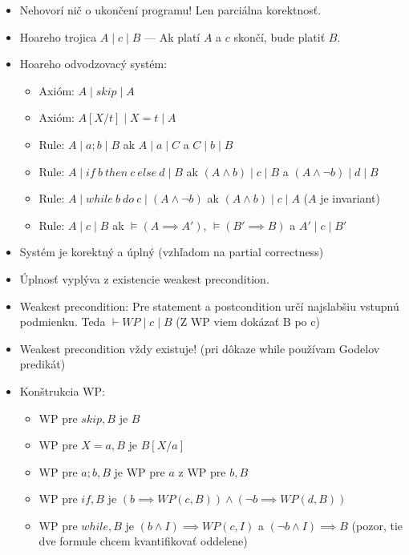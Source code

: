 \documentclass[paper=a4, fontsize=11pt]{scrartcl} %
\numberwithin{equation}{section} %
\numberwithin{figure}{section} %
\numberwithin{table}{section} %
\begin{document}
\begin{itemize}
	\item Nehovorí nič o ukončení programu! Len parciálna korektnosť.
	
	\item Hoareho trojica $A \mid c \mid B$ — Ak platí $A$ a $c$ skončí, bude platiť $B$.
	
	\item Hoareho odvodzovacý systém:
	
	\begin{itemize}
		\item Axióm: $A \mid skip \mid A$
		\item Axióm: $A[X/t] \mid X = t \mid A$
		\item Rule: $A \mid a;b \mid B$ ak $A \mid a \mid C$ a $C \mid b \mid B$
		\item Rule: $A \mid if\ b\ then\ c\ else\ d \mid B$ ak $(A \land b) \mid c \mid B$ a $(A \land \neg b) \mid d \mid B$
		\item Rule: $A \mid while\ b\ do\ c \mid (A \land \neg b)$ ak $(A \land b) \mid c \mid A$ ($A$ je invariant)
		\item Rule: $A \mid c \mid B$ ak $\models (A \implies A')$, $\models (B' \implies B)$ a $A' \mid c \mid B'$
	\end{itemize}

	\item Systém je korektný a úplný (vzhľadom na partial correctness)
	
	\item Úplnosť vyplýva z existencie weakest precondition.
	
	\item Weakest precondition: Pre statement a postcondition určí najslabšiu vstupnú podmienku. Teda $\vdash WP \mid c \mid B$ (Z WP viem dokázať B po c)
	
	\item Weakest precondition vždy existuje! (pri dôkaze while používam Godelov predikát)
	
	\item Konštrukcia WP:
	
	\begin{itemize}
		\item WP pre $skip, B$ je $B$
		\item WP pre $X = a, B$ je $B[X/a]$
		\item WP pre $a;b, B$ je WP pre $a$ z WP pre $b, B$
		\item WP pre $if, B$ je $(b \implies WP(c, B)) \land (\neg b \implies WP(d, B))$
		\item WP pre $while, B$ je $(b \land I) \implies WP(c, I)$ a $(\neg b \land I) \implies B$ (pozor, tie dve formule chcem kvantifikovať oddelene)
	\end{itemize}


\end{itemize}
\end{document}
